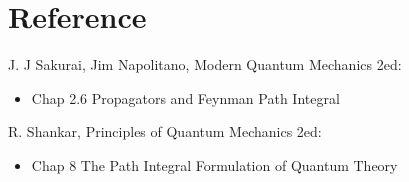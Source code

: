\documentclass[11pt]{article}
\begin{document}
\section{Reference}
\label{sec:org2b5d1e2}

J. J Sakurai, Jim Napolitano, Modern Quantum Mechanics 2ed:
\begin{itemize}
\item Chap 2.6 Propagators and Feynman Path Integral
\end{itemize}

R. Shankar, Principles of Quantum Mechanics 2ed:
\begin{itemize}
\item Chap 8 The Path Integral Formulation of Quantum Theory
\end{itemize}
\end{document}
